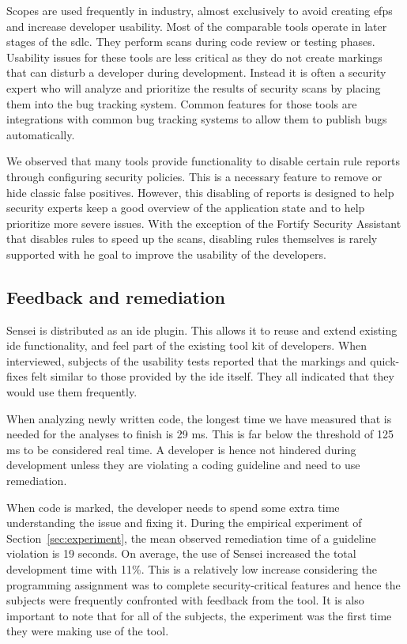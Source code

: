 Scopes are used frequently in industry, almost exclusively to avoid creating \glspl{efp} and increase developer usability.
Most of the comparable tools operate in later stages of the \gls{sdlc}.
They perform scans during code review or testing phases.
Usability issues for these tools are less critical as they do not create markings that can disturb a developer during development.
Instead it is often a security expert who will analyze and prioritize the results of security scans by placing them into the bug tracking system.
Common features for those tools are integrations with common bug tracking systems to allow them to publish bugs automatically.

We observed that many tools provide functionality to disable certain rule reports through configuring security policies.
This is a necessary feature to remove or hide classic false positives.
However, this disabling of reports is designed to help security experts keep a good overview of the application state and to help prioritize more severe issues.
With the exception of the Fortify Security Assistant that disables rules to speed up the scans, disabling rules themselves is rarely supported with he goal to improve the usability of the developers.

\subsection{Feedback and remediation}
Sensei is distributed as an \gls{ide} plugin.
This allows it to reuse and extend existing \gls{ide} functionality, and feel part of the existing tool kit of developers.
When interviewed, subjects of the usability tests reported that the markings and quick-fixes felt similar to those provided by the \gls{ide} itself.
They all indicated that they would use them frequently.

When analyzing newly written code, the longest time we have measured that is needed for the analyses to finish is 29 ms.
This is far below the threshold of 125 ms to be considered real time.
A developer is hence not hindered during development unless they are violating a coding guideline and need to use remediation.

When code is marked, the developer needs to spend some extra time understanding the issue and fixing it.
During the empirical experiment of Section~\ref{sec:experiment}, the mean observed remediation time of a guideline violation is 19 seconds.
On average, the use of Sensei increased the total development time with 11\%.
This is a relatively low increase considering the programming assignment was to complete security-critical features and hence the subjects were frequently confronted with feedback from the tool.
It is also important to note that for all of the subjects, the experiment was the first time they were making use of the tool.


